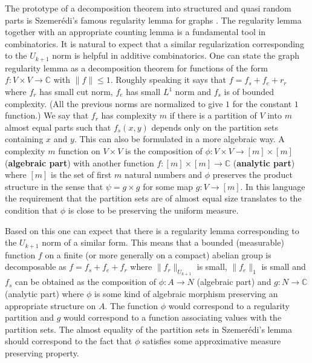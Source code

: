 \documentclass [11pt] {article}
\begin{document}
The prototype of a decomposition theorem into structured and quasi random parts is Szemer\'edi's famous regularity lemma for graphs \cite{Szem2}.
The regularity lemma together with an appropriate counting lemma is a fundamental tool in combinatorics.
It is natural to expect that a similar regularization corresponding to the $U_{k+1}$ norm is helpful in additive combinatorics.
One can state the graph regularity lemma as a decomposition theorem for functions of the form $f:V\times V\rightarrow\mathbb{C}$ with $\|f\|\leq 1$.
Roughly speaking it says that $f=f_s+f_e+r_r$ where $f_r$ has small cut norm, $f_e$ has small $L^1$ norm and $f_s$ is of bounded complexity. (All the previous norms are normalized to give $1$ for the constant $1$ function.) We say that $f_r$ has complexity $m$ if there is a partition of $V$ into $m$ almost equal parts such that $f_s(x,y)$ depends only on the partition sets containing $x$ and $y$. This can also be formulated in a more algebraic way. A complexity $m$ function on $V\times V$ is the composition of $\phi:V\times V\rightarrow [m]\times [m]$ ({\bf algebraic part}) with another function $f:[m]\times [m]\rightarrow\mathbb{C}$ ({\bf analytic part}) where $[m]$ is the set of first $m$ natural numbers and $\phi$ preserves the product structure in the sense that $\psi=g\times g$ for some map $g:V\rightarrow [m]$. 
In this language the requirement that the partition sets are of almost equal size translates to the condition that $\phi$ is close to be preserving the uniform measure. 

Based on this one can expect that there is a regularity lemma corresponding to the $U_{k+1}$ norm of a similar form.
This means that a bounded (measurable) function $f$ on a finite (or more generally on a compact) abelian group is decomposable as 
$f=f_s+f_e+f_r$ where $\|f_r\|_{U_{k+1}}$ is small, $\|f_e\|_1$ is small and $f_s$ can be obtained as the composition of $\phi:A\rightarrow N$ (algebraic part) and $g:N\rightarrow\mathbb{C}$ (analytic part) where $\phi$ is some kind of algebraic morphism preserving an appropriate structure on $A$.
The function $\phi$ would correspond to a regularity partition and $g$ would correspond to a function associating values with the partition sets.
The almost equality of the partition sets in Szemer\'edi's lemma should correspond to the fact that $\phi$ satisfies some approximative measure preserving property. 
\end{document}

